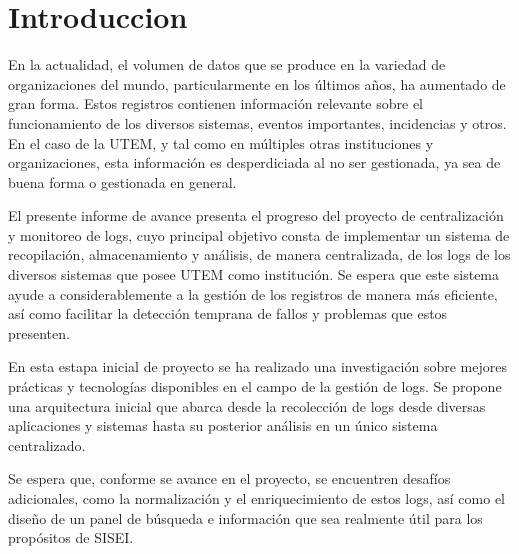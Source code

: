 
\section{Introduccion}

En la actualidad, el volumen de datos que se produce en la variedad de organizaciones del mundo, particularmente en los últimos años, ha aumentado de gran forma. Estos registros contienen información relevante sobre el funcionamiento de los diversos sistemas, eventos importantes, incidencias y otros. En el caso de la UTEM, y tal como en múltiples otras instituciones y organizaciones, esta información es desperdiciada al no ser gestionada, ya sea de buena forma o gestionada en general.

El presente informe de avance presenta el progreso del proyecto de centralización y monitoreo de logs, cuyo principal objetivo consta de implementar un sistema de recopilación, almacenamiento y análisis, de manera centralizada, de los logs de los diversos sistemas que posee UTEM como institución. Se espera que este sistema ayude a considerablemente a la gestión de los registros de manera más eficiente, así como facilitar la detección temprana de fallos y problemas que estos presenten.

En esta estapa inicial de proyecto se ha realizado una investigación sobre mejores prácticas y tecnologías disponibles en el campo de la gestión de logs. Se propone una arquitectura inicial que abarca desde la recolección de logs desde diversas aplicaciones y sistemas hasta su posterior análisis en un único sistema centralizado.

Se espera que, conforme se avance en el proyecto, se encuentren desafíos adicionales, como la normalización y el enriquecimiento de estos logs, así como el diseño de un panel de búsqueda e información que sea realmente útil para los propósitos de SISEI.

\clearpage
